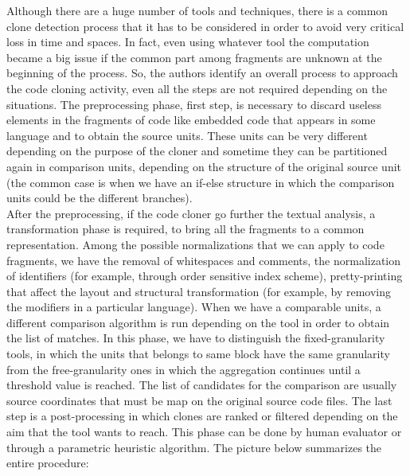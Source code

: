 Although there are a huge number of tools and techniques, there is a common clone detection process that it has to be considered in order to avoid very critical loss in time and spaces. In fact, even using whatever tool the computation became a big issue if the common part among fragments are unknown at the beginning of the process. So, the authors identify an overall process to approach the code cloning activity, even all the steps are not required depending on the situations. The preprocessing phase, first step, is necessary to discard useless elements in the fragments of code like embedded code that appears in some language and to obtain the source units. These units can be very different depending on the purpose of the cloner and sometime they can be partitioned again in comparison units, depending on the structure of the original source unit (the common case is when we have an if-else structure in which the comparison units could be the different branches). \\
After the preprocessing, if the code cloner go further the textual analysis, a transformation phase is required, to bring all the fragments to a common representation. Among the possible normalizations that we can apply to code fragments, we have the removal of whitespaces and comments, the normalization of identifiers (for example, through order sensitive index scheme), pretty-printing that affect the layout and structural transformation (for example, by removing the modifiers in a particular language). When we have a comparable units, a different comparison algorithm is run depending on the tool in order to obtain the list of matches. In this phase, we have to distinguish the fixed-granularity tools, in which the units that belongs to same block have the same granularity from the free-granularity ones in which the aggregation continues until a threshold value is reached. The list of candidates for the comparison are usually source coordinates that must be map on the original source code files. The last step is a post-processing in which clones are ranked or filtered depending on the aim that the tool wants to reach. This phase can be done by human evaluator or through a parametric heuristic algorithm. The picture below summarizes the entire procedure:\\

